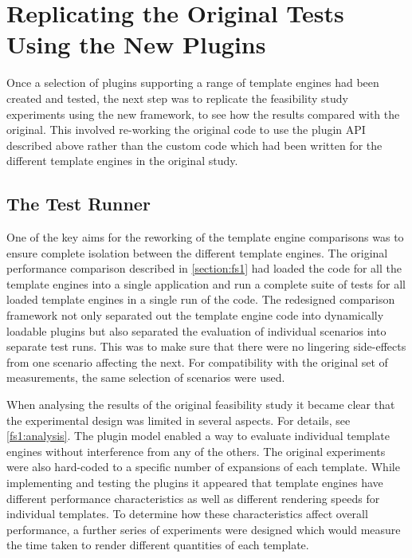 \section{Replicating the Original Tests Using the New Plugins}
\label{section:comp:test replication}

Once a selection of plugins supporting a range of template engines had been created and tested, the next step was to replicate the feasibility study experiments using the new framework, to see how the results compared with the original. This involved re-working the original code to use the plugin API described above rather than the custom code which had been written for the different template engines in the original study.

\subsection{The Test Runner}
\label{section:comp:test runner}

One of the key aims for the reworking of the template engine comparisons was to ensure complete isolation between the different template engines. The original performance comparison described in \autoref{section:fs1} had loaded the code for all the template engines into a single application and run a complete suite of tests for all loaded template engines in a single run of the code. The redesigned comparison framework not only separated out the template engine code into dynamically loadable plugins but also separated the evaluation of individual scenarios into separate test runs. This was to make sure that there were no lingering side-effects from one scenario affecting the next. For compatibility with the original set of measurements, the same selection of scenarios were used.

When analysing the results of the original feasibility study it became clear that the experimental design was limited in several aspects. For details, see \autoref{fs1:analysis}. The plugin model enabled a way to evaluate individual template engines without interference from any of the others. The original experiments were also hard-coded to a specific number of expansions of each template. While implementing and testing the plugins it appeared that template engines have different performance characteristics as well as different rendering speeds for individual templates. To determine how these characteristics affect overall performance, a further series of experiments were designed which would measure the time taken to render different quantities of each template.

